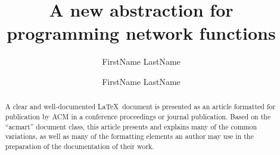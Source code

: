\documentclass[sigconf]{acmart}
\begin{document}
\title{A new abstraction for programming network functions}

\author{FirstName LastName}

\author{FirstName LastName}



\begin{abstract}
  A clear and well-documented \LaTeX\ document is presented as an
  article formatted for publication by ACM in a conference proceedings
  or journal publication. Based on the ``acmart'' document class, this
  article presents and explains many of the common variations, as well
  as many of the formatting elements an author may use in the
  preparation of the documentation of their work.
\end{abstract}


\maketitle







% 
\end{document}
